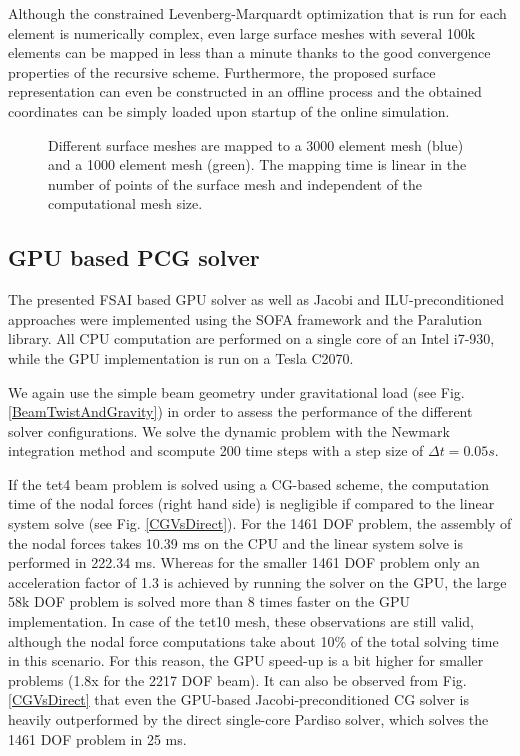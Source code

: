 Although the constrained Levenberg-Marquardt optimization that is run for each element is numerically complex, even large surface meshes with several 100k elements can be mapped in less than a minute thanks to the good convergence properties of the recursive scheme. Furthermore, the proposed surface representation can even be constructed in an offline process and the obtained coordinates can be simply loaded upon startup of the online simulation.

\begin{figure}
   \centering   
	\caption{Different surface meshes are mapped to a 3000 element mesh (blue) and a 1000 element mesh (green). The mapping time is linear in the number of points of the surface mesh and independent of the computational mesh size.}
\label{MappingConvergence}
\end{figure}



\subsection{GPU based PCG solver}

The presented FSAI based GPU solver as well as Jacobi and ILU-preconditioned approaches were implemented using the SOFA framework \cite{Faure2012} and the Paralution library. All CPU computation are performed on a single core of an Intel i7-930, while the GPU implementation is run on a Tesla C2070. 

We again use the simple beam geometry under gravitational load (see Fig. \ref{BeamTwistAndGravity}) in order to assess the performance of the different solver configurations. We solve the dynamic problem with the Newmark integration method and scompute 200 time steps with a step size of $\Delta t = 0.05s$.

If the tet4 beam problem is solved using a CG-based scheme, the computation time of the nodal forces (right hand side) is negligible if compared to the linear system solve (see Fig. \ref{CGVsDirect}). For the 1461 DOF problem, the assembly of the nodal forces takes 10.39 ms on the CPU and the linear system solve is performed in 222.34 ms. Whereas for the smaller 1461 DOF problem only an acceleration factor of 1.3 is achieved by running the solver on the GPU, the large 58k DOF problem is solved more than 8 times faster on the GPU implementation. In case of the tet10 mesh, these observations are still valid, although the nodal force computations take about 10\% of the total solving time in this scenario. For this reason, the GPU speed-up is a bit higher for smaller problems (1.8x for the 2217 DOF beam). It can also be observed from Fig. \ref{CGVsDirect} that even the GPU-based Jacobi-preconditioned CG solver is heavily outperformed by the direct single-core Pardiso solver, which solves the 1461 DOF problem in 25 ms. 


